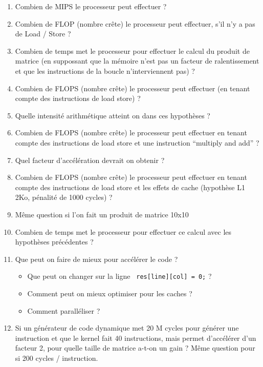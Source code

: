 \documentclass{article}
\begin{document}
\begin{enumerate}
\item Combien de MIPS le processeur peut effectuer ?
  
  
\item Combien de FLOP (nombre crête) le processeur peut effectuer,
  s'il n'y a pas de Load / Store ?
  
  
\item Combien de temps met le processeur pour effectuer le calcul du
  produit de matrice (en suppossant que la mémoire n'est pas un
  facteur de ralentissement et que les instructions de la boucle
  n'interviennent pas) ?
  
  
\item Combien de FLOPS (nombre crête) le processeur peut effectuer (en
  tenant compte des instructions de load store) ?
  
  
\item Quelle intensité arithmétique atteint on dans ces hypothèses ?
  
\item Combien de FLOPS (nombre crête) le processeur peut effectuer en
  tenant compte des instructions de load store et une instruction
  ``multiply and add'' ?
\item Quel facteur d'accélération devrait on obtenir ?
\item Combien de FLOPS (nombre crête) le processeur peut effectuer
  en tenant compte des instructions de load store et les effets
  de cache (hypothèse L1 2Ko, pénalité de 1000 cycles) ?
\item Même question si l'on fait un produit de matrice 10x10
\item Combien de temps met le processeur pour effectuer ce calcul
  avec les hypothèses précédentes ?
\item Que peut on faire de mieux pour accélérer le code ?
  \begin{itemize}
  \item Que peut on changer sur la ligne \texttt{ res[line][col] = 0;} ?
  \item Comment peut on mieux optimiser pour les caches ?
  \item Comment paralléliser ?
  \end{itemize}
\item Si un générateur de code dynamique met 20 M cycles pour générer
  une instruction et que le kernel fait 40 instructions, mais permet
  d'accélérer d'un facteur 2, pour quelle taille de matrice a-t-on un
  gain ? Même question pour si 200 cycles / instruction.
\end{enumerate}
\end{document}
